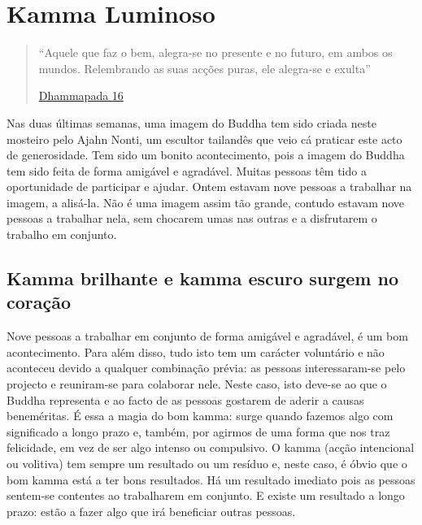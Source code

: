 
\chapter{Kamma Luminoso}


\begin{quote}

``Aquele que faz o bem, alegra-se no presente e no futuro, em ambos os mundos. Relembrando as suas acções puras, ele alegra-se e exulta''

\href{https://suttacentral.net/dhp1-20/en/buddharakkhita}{Dhammapada 16}

\end{quote}

Nas duas últimas semanas, uma imagem do Buddha tem sido criada neste mosteiro
pelo Ajahn Nonti, um escultor tailandês que veio cá praticar este acto de
generosidade. Tem sido um bonito acontecimento, pois a imagem do Buddha tem sido
feita de forma amigável e agradável. Muitas pessoas têm tido a oportunidade de
participar e ajudar. Ontem estavam nove pessoas a trabalhar na imagem, a
alisá-la. Não é uma imagem assim tão grande, contudo estavam nove pessoas a
trabalhar nela, sem chocarem umas nas outras e a disfrutarem o trabalho em
conjunto.

\section{Kamma brilhante e kamma escuro surgem no coração}

Nove pessoas a trabalhar em conjunto de forma amigável e agradável, é um bom
acontecimento. Para além disso, tudo isto tem um carácter voluntário e não
aconteceu devido a qualquer combinação prévia: as pessoas interessaram-se pelo
projecto e reuniram-se para colaborar nele. Neste caso, isto deve-se ao que o
Buddha representa e ao facto de as pessoas gostarem de aderir a causas
beneméritas. É essa a magia do bom kamma: surge quando fazemos algo com
significado a longo prazo e, também, por agirmos de uma forma que nos traz
felicidade, em vez de ser algo intenso ou compulsivo. O kamma (acção intencional
ou volitiva) tem sempre um resultado ou um resíduo e, neste caso, é óbvio que o
bom kamma está a ter bons resultados. Há um resultado imediato pois as pessoas
sentem-se contentes ao trabalharem em conjunto. E existe um resultado a longo
prazo: estão a fazer algo que irá beneficiar outras pessoas.

